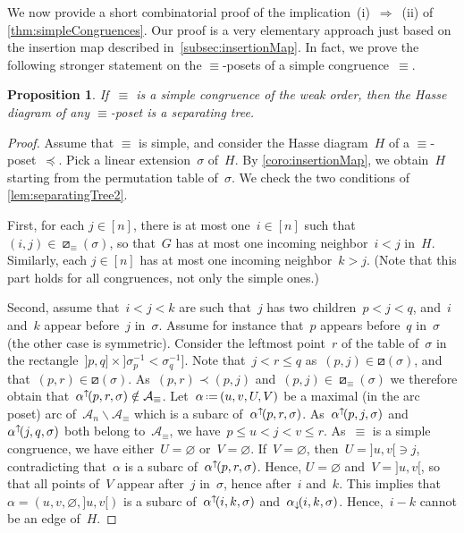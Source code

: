 \documentclass{amsart}
\newtheorem{proposition}[theorem]{Proposition}
\theoremstyle{definition}
\newcommand{\ssm}{\smallsetminus} %
\newcommand{\eqdef}{\mbox{\,\raisebox{0.2ex}{\scriptsize\ensuremath{\mathrm:}}\ensuremath{=}\,}} %
\newcommand{\arcs}{{\mathcal{A}}} %
\newcommand{\arcDown}{\smash{\alpha_{\downarrow\!}}} %
\newcommand{\arcUp}{\smash{\alpha^{\uparrow\!}}} %
\begin{document}
We now provide a short combinatorial proof of the implication~(i)~$\Longrightarrow$~(ii) of \cref{thm:simpleCongruences}.
Our proof is a very elementary approach just based on the insertion map described in~\cref{subsec:insertionMap}.
In fact, we prove the following stronger statement on the $\equiv$-posets of a simple congruence~$\equiv$.

\begin{proposition}
\label{prop:simpleImpliesSeparatingTrees}
If~$\equiv$ is a simple congruence of the weak order, then the Hasse diagram of any $\equiv$-poset is a separating tree.
\end{proposition}

\begin{proof}
Assume that $\equiv$ is simple, and consider the Hasse diagram~$H$ of a $\equiv$-poset~$\preccurlyeq$.
Pick a linear extension~$\sigma$ of~$H$.
By \cref{coro:insertionMap}, we obtain~$H$ starting from the permutation table of~$\sigma$.
We check the two conditions of \cref{lem:separatingTree2}.

First, for each $j \in [n]$, there is at most one~$i \in [n]$ such that~$(i,j) \in \boxslash_\equiv(\sigma)$, so that~$G$ has at most one incoming neighbor~$i < j$ in~$H$.
Similarly, each $j \in [n]$ has at most one incoming neighbor~$k > j$.
(Note that this part holds for all congruences, not only the simple ones.)

Second, assume that~$i < j < k$ are such that~$j$ has two children~$p < j < q$, and~$i$ and~$k$ appear before~$j$ in~$\sigma$.
Assume for instance that~$p$ appears before~$q$ in~$\sigma$ (the other case is symmetric).
Consider the leftmost point~$r$ of the table of~$\sigma$ in the rectangle~${]p, q]} \times {]\sigma^{-1}_p < \sigma^{-1}_q]}$.
Note that~${j < r \le q}$ as~$(p,j) \in \boxslash(\sigma)$, and that~$(p,r) \in \boxslash(\sigma)$.
As~$(p, r) \prec (p, j)$ and~$(p, j) \in \boxslash_\equiv(\sigma)$ we therefore obtain that~$\arcUp(p, r, \sigma) \notin \arcs_\equiv$.
Let~$\alpha \eqdef (u, v, U, V)$ be a maximal (in the arc poset) arc of~$\arcs_n \ssm \arcs_\equiv$ which is a subarc of~$\arcUp(p, r, \sigma)$.
As~$\arcUp(p, j, \sigma)$ and~$\arcUp(j, q, \sigma)$ both belong to~$\arcs_\equiv$, we have~$p \le u < j < v \le r$.
As~$\equiv$ is a simple congruence, we have either~$U = \varnothing$ or~$V = \varnothing$.
If~$V = \varnothing$, then~$U = {]u,v[} \ni j$, contradicting that~$\alpha$ is a subarc of~$\arcUp(p, r, \sigma)$.
Hence, $U = \varnothing$ and~$V = {]u,v[}$, so that all points of~$V$ appear after~$j$ in~$\sigma$, hence after~$i$ and~$k$.
This implies that~$\alpha = (u, v, \varnothing, {]u,v[})$ is a subarc of~$\arcUp(i, k, \sigma)$ and~$\arcDown(i, k, \sigma)$.
Hence,~$i-k$ cannot be an edge of~$H$.
\end{proof}
\end{document}
